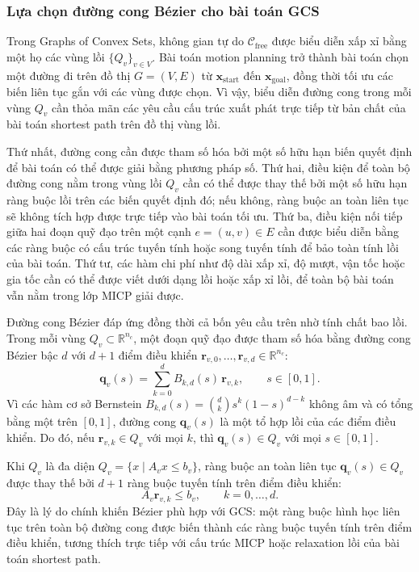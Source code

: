 \subsubsection{Lựa chọn đường cong Bézier cho bài toán GCS}
\label{subsubsec:bezier_motivation}

Trong Graphs of Convex Sets, không gian tự do $\mathcal{C}_{\mathrm{free}}$ được biểu
diễn xấp xỉ bằng một họ các vùng lồi $\{Q_v\}_{v \in V}$.
Bài toán motion planning trở thành bài toán chọn một đường đi trên đồ thị $G=(V,E)$
từ $\mathbf{x}_{\mathrm{start}}$ đến $\mathbf{x}_{\mathrm{goal}}$, đồng thời tối ưu
các biến liên tục gắn với các vùng được chọn.
Vì vậy, biểu diễn đường cong trong mỗi vùng $Q_v$ cần thỏa mãn các yêu cầu cấu trúc
xuất phát trực tiếp từ bản chất của bài toán shortest path trên đồ thị vùng lồi.

Thứ nhất, đường cong cần được tham số hóa bởi một số hữu hạn biến quyết định để bài
toán có thể được giải bằng phương pháp số.
Thứ hai, điều kiện để toàn bộ đường cong nằm trong vùng lồi $Q_v$ cần có thể được thay
thế bởi một số hữu hạn ràng buộc lồi trên các biến quyết định đó; nếu không, ràng buộc
an toàn liên tục sẽ không tích hợp được trực tiếp vào bài toán tối ưu.
Thứ ba, điều kiện nối tiếp giữa hai đoạn quỹ đạo trên một cạnh $e=(u,v) \in E$ cần
được biểu diễn bằng các ràng buộc có cấu trúc tuyến tính hoặc song tuyến tính để bảo
toàn tính lồi của bài toán.
Thứ tư, các hàm chi phí như độ dài xấp xỉ, độ mượt, vận tốc hoặc gia tốc cần có thể
được viết dưới dạng lồi hoặc xấp xỉ lồi, để toàn bộ bài toán vẫn nằm trong lớp MICP
giải được.

Đường cong Bézier đáp ứng đồng thời cả bốn yêu cầu trên nhờ tính chất bao lồi.
Trong mỗi vùng $Q_v \subset \mathbb{R}^{n_c}$, một đoạn quỹ đạo được tham số hóa bằng
đường cong Bézier bậc $d$ với $d+1$ điểm điều khiển
$\mathbf{r}_{v,0}, \ldots, \mathbf{r}_{v,d} \in \mathbb{R}^{n_c}$:
\[
    \mathbf{q}_v(s)
    = \sum_{k=0}^{d} B_{k,d}(s)\,\mathbf{r}_{v,k},
    \qquad s \in [0,1].
\]
Vì các hàm cơ sở Bernstein $B_{k,d}(s) = \binom{d}{k}s^k(1-s)^{d-k}$ không âm và
có tổng bằng một trên $[0,1]$, đường cong $\mathbf{q}_v(s)$ là một tổ hợp lồi của
các điểm điều khiển.
Do đó, nếu $\mathbf{r}_{v,k} \in Q_v$ với mọi $k$, thì $\mathbf{q}_v(s) \in Q_v$
với mọi $s \in [0,1]$.

Khi $Q_v$ là đa diện $Q_v = \{x \mid A_v x \le b_v\}$, ràng buộc an toàn liên tục
$\mathbf{q}_v(s) \in Q_v$ được thay thế bởi $d+1$ ràng buộc tuyến tính trên điểm
điều khiển:
\[
    A_v \mathbf{r}_{v,k} \le b_v, \qquad k = 0, \ldots, d.
\]
Đây là lý do chính khiến Bézier phù hợp với GCS: một ràng buộc hình học liên tục
trên toàn bộ đường cong được biến thành các ràng buộc tuyến tính trên điểm điều khiển,
tương thích trực tiếp với cấu trúc MICP hoặc relaxation lồi của bài toán shortest path.

